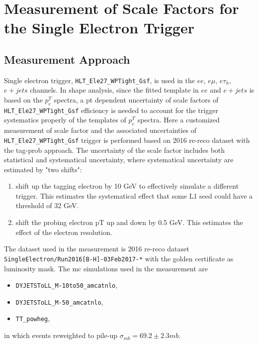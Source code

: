 
\section{Measurement of Scale Factors for the Single Electron Trigger}
\label{sec:app:eTriggerEff}

\subsection{Measurement Approach}

Single electron trigger, \texttt{HLT\_Ele27\_WPTight\_Gsf}, is used in the $ee$, $e\mu$, $e\tau_h$, $e+jets$ channels.
In shape analysis, since the fitted template in $ee$ and $e+jets$ is based on the $p^T_e$ spectra, a pt dependent 
uncertainty of scale factors of \texttt{HLT\_Ele27\_WPTight\_Gsf} efficiency is needed to account for the trigger 
systematics properly of the templates of $p^T_e$ spectra. Here a customized measurement of scale factor and the 
associated uncertainties
of \texttt{HLT\_Ele27\_WPTight\_Gsf} trigger is performed based on 2016 re-reco dataset with the tag-prob approach. 
The uncertainty
of the scale factor includes both statistical and systematical uncertainty, where systematical uncertainty are estimated by
"two shifts":

\begin{enumerate}
  \item shift up the tagging electron by 10 GeV to effectively simulate a different trigger. This estimates the 
  systematical effect that some L1 seed could have a threshold of 32 GeV.
  \item shift the probing electron pT up and down by 0.5 GeV. This estimates the effect of the electron \pt resolution.
\end{enumerate}

The dataset used in the measurement is 2016 re-reco dataset \texttt{ SingleElectron/Run2016[B-H]-03Feb2017-*}
with the golden certificate as luminosity mask. The mc simulations used in the measurement are 
\begin{itemize}
    \item \texttt{DYJETSToLL\_M-10to50\_amcatnlo},
    \item \texttt{DYJETSToLL\_M-50\_amcatnlo},
    \item \texttt{TT\_powheg},
\end{itemize}
\noindent in which events reweighted to pile-up $\sigma_{mb} = 69.2\pm 2.3 mb$.

